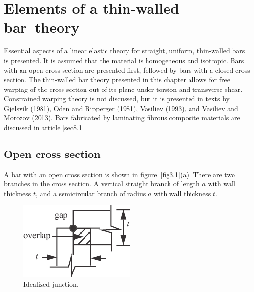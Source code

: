 \documentclass{AeroStructure-ERJohnson}
\begin{document}
\mainmatter
\setcounter{page}{29}

\setcounter{chapter}{2}


\chapter{Elements of a thin-walled bar~theory} \label{ch3}

Essential aspects of a linear elastic theory for straight, uniform, thin-walled bars is presented. It is assumed that the material is homogeneous and isotropic. Bars with an open cross section are presented first, followed by bars with a closed cross section. The thin-walled bar theory presented in this chapter allows for free warping of the cross section out of its plane under torsion and transverse shear. Constrained warping theory is not discussed, but it is presented in texts by Gjelsvik (1981), Oden and Ripperger (1981), Vasiliev (1993), and Vasiliev and Morozov (2013). Bars fabricated by laminating fibrous composite materials are discussed in article \ref{sec8.1}.

\section{Open cross section}\label{sec3.1}

A bar with an open cross section is shown in figure~\ref{fig3.1}(a). There are two branches in the cross section. A vertical straight branch of length $a$ with wall thickness $t$, and a semicircular branch of radius $a$ with wall thickness $t$.


{\def\thefigure{3.1}
}

\pagebreak
\begin{figure}
\includegraphics{Figure_3-2.pdf}
\caption{Idealized junction.\label{fig3.2}}
\end{figure}
\end{document}

